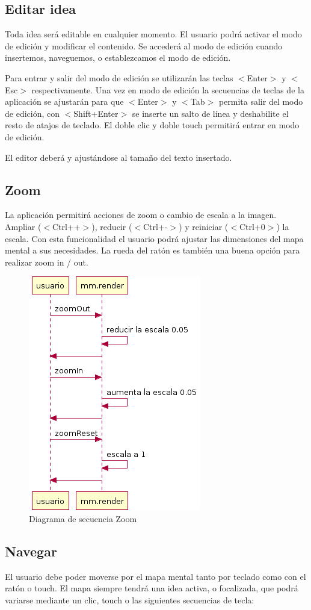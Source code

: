 \subsection{Editar idea}
Toda idea será editable en cualquier momento. El usuario podrá activar el modo de edición y modificar el contenido. Se accederá al modo de edición cuando insertemos, naveguemos, o establezcamos el modo de edición. 

Para entrar y salir del modo de edición se utilizarán las teclas $<$Enter$>$ y $<$Esc$>$ respectivamente. Una vez en modo de edición la secuencias de teclas de la aplicación se ajustarán para que $<$Enter$>$ y $<$Tab$>$ permita salir del modo de edición, con $<$Shift+Enter$>$ se inserte un salto de línea y deshabilite el resto de atajos de teclado. El doble clic y doble touch permitirá entrar en modo de edición.

El editor deberá y ajustándose al tamaño del texto insertado.   

\subsection{Zoom}
La aplicación permitirá acciones de zoom o cambio de escala a la imagen. Ampliar ($<$Ctrl++$>$), reducir ($<$Ctrl+-$>$) y reiniciar ($<$Ctrl+0$>$) la escala. Con esta funcionalidad el usuario podrá ajustar las dimensiones del mapa mental a sus necesidades. La rueda del ratón es también una buena opción para realizar zoom in / out.

\begin{figure}[tbph]
\centering
\includegraphics[width=0.4\linewidth]{imagenes/diagrama-seq-zoom}
\caption{Diagrama de secuencia Zoom}
\label{fig:diagrama-seq-zoom}
\end{figure}


\subsection{Navegar}
El usuario debe poder moverse por el mapa mental tanto por teclado como con el ratón o touch. El mapa siempre tendrá una idea activa, o focalizada, que podrá variarse mediante un clic, touch o las siguientes secuencias de tecla:

